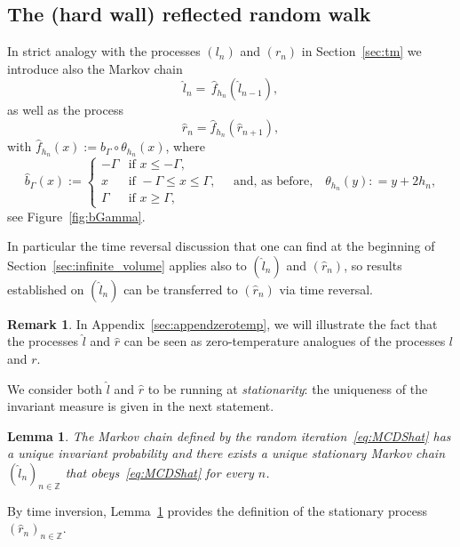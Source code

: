 \documentclass[10pt]{amsart}
\newtheorem{lemm}[theo]{Lemma}\newtheorem{prop}[theo]{Proposition}\newtheorem{coro}[theo]{Corollary}\newtheorem{conj}[theo]{Conjecture}
\theoremstyle{definition}\newtheorem{defi}[theo]{Definition}\newtheorem{rema}[theo]{Remark}\newtheorem{exam}[theo]{Example}\newtheorem{exem}[theo]{Example}\newtheorem{nota}[theo]{Notation}
\newcommand{\bbZ}{\mathbb{Z}}
\newcommand{\gG}{\Gamma}
\newcommand{\ls}{\widehat{l}}
\newcommand{\rs}{\widehat{r}}
\begin{document}
\subsection{The (hard wall) reflected random walk}\label{sec:constrained}

In strict analogy with the processes $(l_n)$ and $(r_n)$ in Section~\ref{sec:tm} we introduce also the Markov chain
\begin{equation}\label{eq:MCDShat}
\ls_{n}= \, \widehat f_{h_{n}}(\ls_{n-1}),
\end{equation}
as well as the process
\begin{equation}
\rs_{n}= \widehat f_{h_{n}}\left(\rs_{n+1}\right),
\end{equation}
with $\widehat f_{h_{n}}(x) := \widehat b_\gG \circ \theta_{h_n}(x)$, where
\begin{equation}
\widehat b_\gG(x) :=
\begin{cases}
-\gG & \text{if } x\le -\gG,\\
x & \text{if } -\gG \le x \le \gG,\\
\gG & \text{if } x\ge \gG,
\end{cases}
\quad
\text{and, as before,}
\quad
\theta_{h_n}(y) : = y+ 2 h_n,
\end{equation}
see Figure~\ref{fig:bGamma}.

In particular the time reversal discussion that one can find at the beginning of Section~\ref{sec:infinite_volume} applies also to $(\ls_n)$ and $(\rs_n)$, so results established on $(\ls_n)$ can be transferred to $(\rs_n)$ via time reversal.


\begin{rema}
In Appendix~\ref{sec:appendzerotemp}, we will illustrate the fact that the processes $\ls$ and $\rs$ can be seen as zero-temperature analogues of the processes $l$ and $r$.
\end{rema}

We consider both $\ls$ and $\rs$ to be running at \emph{stationarity}: the uniqueness of the invariant measure is given in the next statement.

\begin{lemm}\label{th:stationary-hat}
The Markov chain defined by the random iteration~\eqref{eq:MCDShat} has a unique invariant probability and there exists a unique stationary Markov chain $(\ls_n)_{n \in \bbZ}$ that obeys~\eqref{eq:MCDShat} for every $n$.
\end{lemm}


By time inversion, Lemma~\ref{th:stationary-hat} provides the definition of the stationary process $(\rs_n)_{n \in \bbZ}$.
\end{document}
